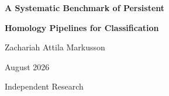 \documentclass[12pt, a4paper]{report}
\theoremstyle{definition}
\theoremstyle{plain}
\theoremstyle{remark}
\begin{document}
\begin{titlepage}
  \centering
  \vspace*{3cm}
  {\LARGE\bfseries A Systematic Benchmark of Persistent\par}
  \vspace{0.2cm}
  {\LARGE\bfseries Homology Pipelines for Classification\par}
  \vspace{2.5cm}
  {\large Zachariah Attila Markusson\par}
  \vspace{2cm}
  {\normalsize August 2026\par}
  \vfill
  {\small Independent Research\par}
\end{titlepage}
\end{document}

